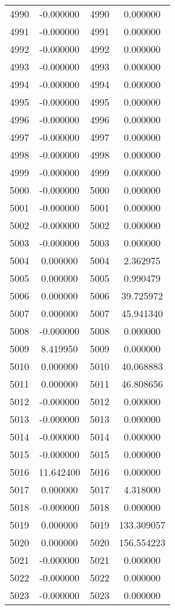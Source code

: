 \documentclass[12pt]{article}
\begin{document}
\begin{longtable}{@{}cccc@{}}
4990 & -0.000000 & 4990 & 0.000000 \\
4991 & -0.000000 & 4991 & 0.000000 \\
4992 & -0.000000 & 4992 & 0.000000 \\
4993 & -0.000000 & 4993 & 0.000000 \\
4994 & -0.000000 & 4994 & 0.000000 \\
4995 & -0.000000 & 4995 & 0.000000 \\
4996 & -0.000000 & 4996 & 0.000000 \\
4997 & -0.000000 & 4997 & 0.000000 \\
4998 & -0.000000 & 4998 & 0.000000 \\
4999 & -0.000000 & 4999 & 0.000000 \\
5000 & -0.000000 & 5000 & 0.000000 \\
5001 & -0.000000 & 5001 & 0.000000 \\
5002 & -0.000000 & 5002 & 0.000000 \\
5003 & -0.000000 & 5003 & 0.000000 \\
5004 & 0.000000 & 5004 & 2.362975 \\
5005 & 0.000000 & 5005 & 0.990479 \\
5006 & 0.000000 & 5006 & 39.725972 \\
5007 & 0.000000 & 5007 & 45.941340 \\
5008 & -0.000000 & 5008 & 0.000000 \\
5009 & 8.419950 & 5009 & 0.000000 \\
5010 & 0.000000 & 5010 & 40.068883 \\
5011 & 0.000000 & 5011 & 46.808656 \\
5012 & -0.000000 & 5012 & 0.000000 \\
5013 & -0.000000 & 5013 & 0.000000 \\
5014 & -0.000000 & 5014 & 0.000000 \\
5015 & -0.000000 & 5015 & 0.000000 \\
5016 & 11.642400 & 5016 & 0.000000 \\
5017 & 0.000000 & 5017 & 4.318000 \\
5018 & -0.000000 & 5018 & 0.000000 \\
5019 & 0.000000 & 5019 & 133.309057 \\
5020 & 0.000000 & 5020 & 156.554223 \\
5021 & -0.000000 & 5021 & 0.000000 \\
5022 & -0.000000 & 5022 & 0.000000 \\
5023 & -0.000000 & 5023 & 0.000000 \\

\end{longtable}
\end{document}
